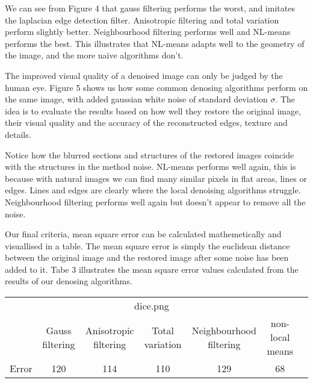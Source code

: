 \documentclass[fullpage]{article}
\begin{document}
We can see from Figure 4 that gauss filtering performs the worst, and imitates the laplacian edge detection filter. Anisotropic filtering and total variation perform slightly better. Neighbourhood filtering performs well and NL-means performs the best. This illustrates that NL-means adapts well to the geometry of the image, and the more naive algorithms don't.

The improved visual quality of a denoised image can only be judged by the human eye. Figure 5 shows us how some common denosing algorithms perform on the same image, with added gaussian white noise of standard deviation $\sigma$. The idea is to evaluate the results based on how well they restore the original image, their visual quality and the accuracy of the reconstructed edges, texture and details.
\newline
\newline

Notice how the blurred sections and structures of the restored images coincide with the structures in the method noise. NL-means performs well again, this is because with natural images we can find many similar pixels in flat areas, lines or edges. Lines and edges are clearly where the local denoising algorithms struggle. Neighbourhood filtering performs well again but doesn't appear to remove all the noise.

Our final criteria, mean square error can be calculated mathemetically and visuallised in a table. The mean square error is simply the euclidean distance between the original image and the restored image after some noise has been added to it. Tabe 3 illustrates the mean square error values calculated from the results of our denosing algorithms.
\newline
\begin{tabular}{c|cccccc}
\multicolumn{6}{c}{dice.png}\\
& Gauss filtering & Anisotropic filtering & Total variation & Neighbourhood filtering & non-local means\\
\hline
Error & 120 & 114 & 110 & 129 & 68\\
\end{tabular}
\newline
\end{document}
